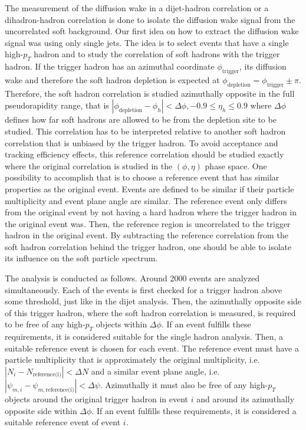 \documentclass[
  a4paper,
  12pt,
  oneside,
  parskip=half,
  listof=totoc,
  bibliography=totoc,
  DIV=12,
  numbers=noenddot,
  BA.tex
  ]{subfiles}
\begin{document}
The measurement of the diffusion wake in a dijet-hadron correlation or a dihadron-hadron correlation is done to isolate the diffusion wake signal from the uncorrelated soft background. Our first idea on how to extract the diffusion wake signal was using only single jets. The idea is to select events that have a single high-$p_T$ hadron and to study the correlation of soft hadrons with the trigger hadron. If the trigger hadron has an azimuthal coordinate $\phi_\text{trigger}$, its diffusion wake and therefore the soft hadron depletion is expected at $\phi_\text{depletion} =  \phi_\text{trigger} \pm \pi$. Therefore, the soft hadron correlation is studied azimuthally opposite in the full pseudorapidity range, that is $|\phi_\text{depletion} - \phi_h| < \Delta \phi, -0.9 \leq \eta_h \leq 0.9$ where $\Delta \phi$ defines how far soft hadrons are allowed to be from the depletion site to be studied. This correlation has to be interpreted relative to another soft hadron correlation that is unbiased by the trigger hadron. To avoid acceptance and tracking efficiency effects, this reference correlation should be studied exactly where the original correlation is studied in the $(\phi, \eta)$ phase space. One possibility to accomplish that is to choose a reference event that has similar properties as the original event. Events are defined to be similar if their particle multiplicity and event plane angle are similar. The reference event only differs from the original event by not having a hard hadron where the trigger hadron in the original event was. Then, the reference region is uncorrelated to the trigger hadron in the original event. By subtracting the reference correlation from the soft hadron correlation behind the trigger hadron, one should be able to isolate its influence on the soft particle spectrum.

The analysis is conducted as follows. Around 2000 events are analyzed simultaneously. Each of the events is first checked for a trigger hadron above some threshold, just like in the dijet analysis. Then, the azimuthally opposite side of this trigger hadron, where the soft hadron correlation is measured, is required to be free of any high-$p_T$ objects within $\Delta \phi$. If an event fulfills these requirements, it is considered suitable for the single hadron analysis. Then, a suitable reference event is chosen for each event. The reference event must have a particle multiplicity that is approximately the original multiplicity, i.e. $|N_i - N_\text{reference(i)}| < \Delta N$ and a similar event plane angle, i.e. $|\psi_{m,i} - \psi_{m,\text{reference(i)}}| < \Delta \psi$. Azimuthally it must also be free of any high-$p_T$ objects around the original trigger hadron in event $i$ and around its azimuthally opposite side within $\Delta \phi$. If an event fulfills these requirements, it is considered a suitable reference event of event $i$.
\end{document}
